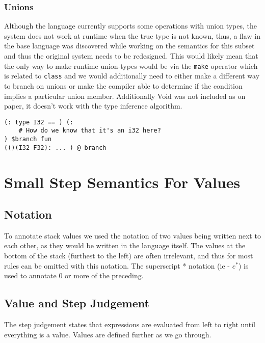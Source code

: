 \documentclass{article}
\begin{document}
\subsubsection{Unions}
Although the language currently supports some operations with union types,
the system does not work at runtime when the true type is not known, thus,
a flaw in the base language was discovered while working on the semantics
for this subset and thus the original system needs to be redesigned. This
would likely mean that the only way to make runtime union-types would be
via the \texttt{make} operator which is related to \texttt{class} and we
would additionally need to either make a different way to branch on unions
or make the compiler able to determine if the condition implies a particular
union member. Additionally Void was not included as on paper, it doesn't
work with the type inference algorithm.

\begin{verbatim}
(: type I32 == ) (: 
    # How do we know that it's an i32 here?
) $branch fun
(()(I32 F32): ... ) @ branch
\end{verbatim}

\section{Small Step Semantics For Values}
\subsection{Notation}
To annotate stack values we used the notation of two values being written next to each other, as they would be written in the language itself. The values at the bottom of the stack (furthest to the left) are often irrelevant, and thus for most rules can be omitted with this notation. The superscript * notation (ie - $e^*$) is used to annotate 0 or more of the preceding.

\subsection{Value and Step Judgement}
The step judgement states that expressions are evaluated from left to right until everything is a value. Values are defined further as we go through.
{
    \centering
    \def \MathparLineskip {\lineskip=0.43cm}
}
\end{document}
